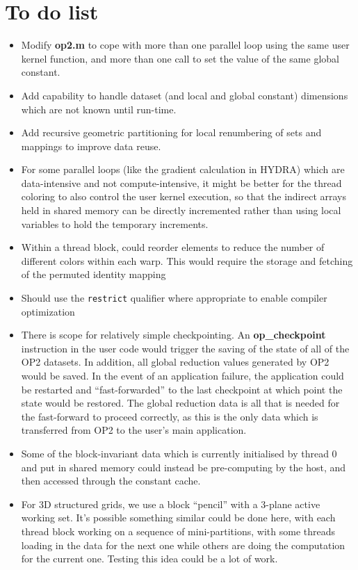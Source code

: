 \documentclass[11pt]{article}
\begin{document}
\newpage

\section{To do list}

\begin{itemize}
\item
Modify {\bf op2.m} to cope with more than one parallel loop using
the same user kernel function, and more than one call to set the
value of the same global constant.

\item
Add capability to handle dataset (and local and global constant) dimensions
which are not known until run-time.

\item
Add recursive geometric partitioning for local renumbering of sets and
mappings to improve data reuse.

\item
For some parallel loops (like the gradient calculation in HYDRA)
which are data-intensive and not compute-intensive, it might be better
for the thread coloring to also control the user kernel execution, so
that the indirect arrays held in shared memory can be directly incremented
rather than using local variables to hold the temporary increments.

\item
Within a thread block, could reorder elements to reduce the number of
different colors within each warp.  This would require the storage and
fetching of the permuted identity mapping

\item
Should use the {\tt restrict} qualifier where appropriate to enable
compiler optimization

\item
There is scope for relatively simple checkpointing. An {\bf op\_checkpoint}
instruction in the user code would trigger the saving of the state of all
of the OP2 datasets.  In addition, all global reduction values generated by
OP2 would be saved.  In the event of an application failure, the application
could be restarted and ``fast-forwarded'' to the last checkpoint at which
point the state would be restored.  The global reduction data is all that is
needed for the fast-forward to proceed correctly, as this is the only data
which is transferred from OP2 to the user's main application.

\item
Some of the block-invariant data which is currently initialised by thread 0
and put in shared memory could instead be pre-computing by the host, and
then accessed through the constant cache.

\item
For 3D structured grids, we use a block ``pencil'' with a 3-plane active
working set.  It's possible something similar could be done here, with each
thread block working on a sequence of mini-partitions, with some threads
loading in the data for the next one while others are doing the computation
for the current one.  Testing this idea could be a lot of work.


\end{itemize}
\end{document}
